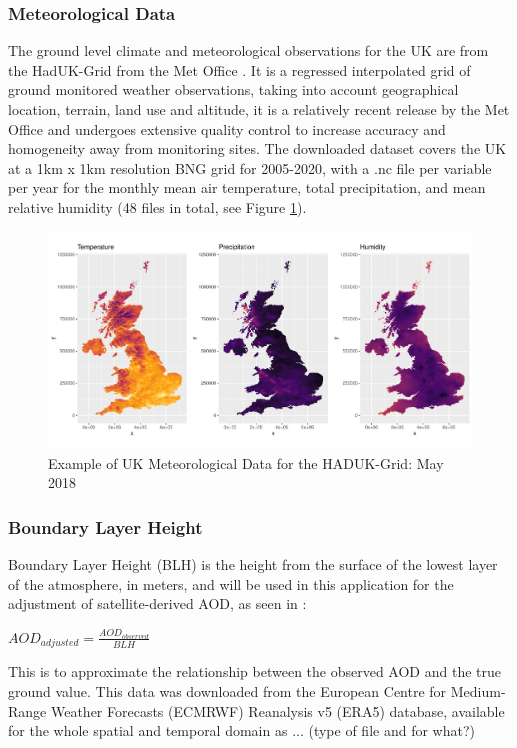 \subsubsection{Meteorological Data}
The ground level climate and meteorological observations for the UK are from the HadUK-Grid from the Met Office \citep{Hollis2019HadUK-GridAObservations}. It is a regressed interpolated grid of ground monitored weather observations, taking into account geographical location, terrain, land use and altitude, it is a relatively recent release by the Met Office and undergoes extensive quality control to increase accuracy and homogeneity away from monitoring sites. The downloaded dataset covers the UK at a 1km x 1km resolution BNG grid for 2005-2020, with a .nc file per variable per year for the monthly mean air temperature, total precipitation, and mean relative humidity (48 files in total, see Figure \ref{fig:met}). 

\begin{figure}[h]
    \centering
    \includegraphics[width=1\textwidth]{Images/Met Data.pdf}
    \caption{Example of UK Meteorological Data for the HADUK-Grid: May 2018}
    \label{fig:met}
\end{figure}

\subsubsection{Boundary Layer Height}
Boundary Layer Height (BLH) is the height from the surface of the lowest layer of the atmosphere, in meters, and will be used in this application for the adjustment of satellite-derived AOD, as seen in \cite{He2019AGuangzhou}:
\begin{center}
    $AOD_{adjusted} = \frac{AOD_{observed}}{BLH}$
\end{center}
This is to approximate the relationship between the observed AOD and the true ground value. This data was downloaded from the European Centre for Medium-Range Weather Forecasts (ECMRWF) Reanalysis v5 (ERA5) database, available for the whole spatial and temporal domain as ... (type of file and for what?)


